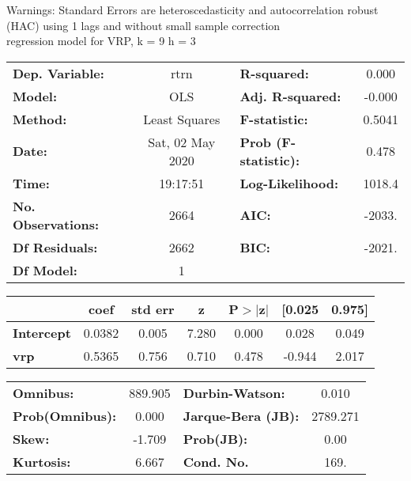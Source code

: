 Warnings: \newline
 [1] Standard Errors are heteroscedasticity and autocorrelation robust (HAC) using 1 lags and without small sample correction\\ 

regression model for VRP, k = 9 h = 3\begin{center}
\begin{tabular}{lclc}
\toprule
\textbf{Dep. Variable:}    &       rtrn       & \textbf{  R-squared:         } &     0.000   \\
\textbf{Model:}            &       OLS        & \textbf{  Adj. R-squared:    } &    -0.000   \\
\textbf{Method:}           &  Least Squares   & \textbf{  F-statistic:       } &    0.5041   \\
\textbf{Date:}             & Sat, 02 May 2020 & \textbf{  Prob (F-statistic):} &    0.478    \\
\textbf{Time:}             &     19:17:51     & \textbf{  Log-Likelihood:    } &    1018.4   \\
\textbf{No. Observations:} &        2664      & \textbf{  AIC:               } &    -2033.   \\
\textbf{Df Residuals:}     &        2662      & \textbf{  BIC:               } &    -2021.   \\
\textbf{Df Model:}         &           1      & \textbf{                     } &             \\
\bottomrule
\end{tabular}
\begin{tabular}{lcccccc}
                   & \textbf{coef} & \textbf{std err} & \textbf{z} & \textbf{P$> |$z$|$} & \textbf{[0.025} & \textbf{0.975]}  \\
\midrule
\textbf{Intercept} &       0.0382  &        0.005     &     7.280  &         0.000        &        0.028    &        0.049     \\
\textbf{vrp}       &       0.5365  &        0.756     &     0.710  &         0.478        &       -0.944    &        2.017     \\
\bottomrule
\end{tabular}
\begin{tabular}{lclc}
\textbf{Omnibus:}       & 889.905 & \textbf{  Durbin-Watson:     } &    0.010  \\
\textbf{Prob(Omnibus):} &   0.000 & \textbf{  Jarque-Bera (JB):  } & 2789.271  \\
\textbf{Skew:}          &  -1.709 & \textbf{  Prob(JB):          } &     0.00  \\
\textbf{Kurtosis:}      &   6.667 & \textbf{  Cond. No.          } &     169.  \\
\bottomrule
\end{tabular}
\end{center}

